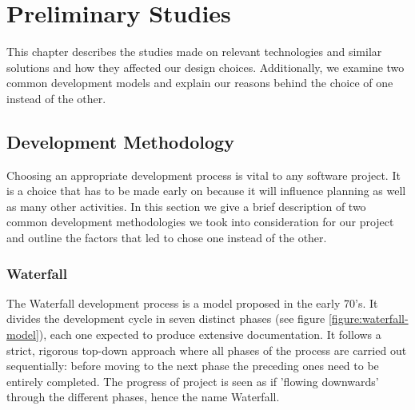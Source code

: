 
\chapter{Preliminary Studies}
\label{Preliminary Studies}

This chapter describes the studies made on relevant technologies and similar solutions and how they affected our design choices. 
Additionally, we examine two common development models and explain our reasons behind the choice of one instead of the other.


\section{Development Methodology}
\label{section:development-methodology}

Choosing an appropriate development process is vital to any software project.
It is a choice that has to be made early on because it will influence planning as well as many other activities. 
In this section we give a brief description of two common development methodologies we took into consideration
for our project and outline the factors that led to chose one instead of the other.

\subsection{Waterfall}

The Waterfall\cite{WaterfallModel} development process is a model proposed in the early 70's.
It divides the development cycle in seven distinct phases (see figure \ref{figure:waterfall-model}),
each one expected to produce extensive documentation.
It follows a strict, rigorous top-down approach where all phases of the process are carried out sequentially:
before moving to the next phase the preceding ones need to be entirely completed. The progress of project
is seen as if 'flowing downwards' through the different phases, hence the name Waterfall. 

